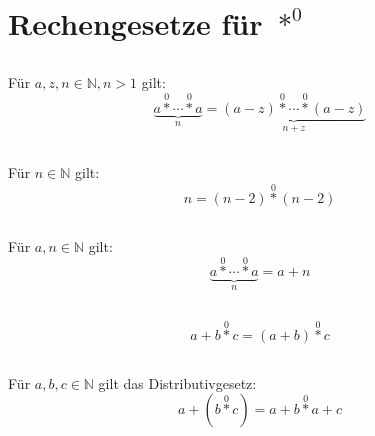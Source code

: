 \documentclass{article}
\begin{document}
\section{Rechengesetze f\"ur $\operatorname*{\ast}^0$\newline}

\subsection{}
F\"ur $a, z, n \in \mathbb{N}, n > 1$ gilt:
\[ \underbrace{a \operatorname*{\ast}^0 \dotsb \operatorname*{\ast}^0 a}_n = \underbrace{\left(a - z\right) \operatorname*{\ast}^0 \dotsb \operatorname*{\ast}^0 \left(a - z\right)}_{n+z} \]
\subsection{}
F\"ur $n \in \mathbb{N}$ gilt:
\[ n = \left(n-2\right)\operatorname*{\ast}^{0}\left(n-2\right) \]
\subsection{}
F\"ur $a, n \in \mathbb{N}$ gilt:
\[ \underbrace{a \operatorname*{\ast}^0 \dotsb \operatorname*{\ast}^0 a}_n = a+n \]
\subsection{}
\[ a+b\operatorname*{\ast}^0c = \left(a+b\right)\operatorname*{\ast}^0 c \]
\subsection{}
F\"ur $a, b, c \in \mathbb{N}$ gilt das Distributivgesetz:
\[ a+\left(b\operatorname*{\ast}^0c\right) = a + b \operatorname*{\ast}^0 a + c \]
\end{document}

